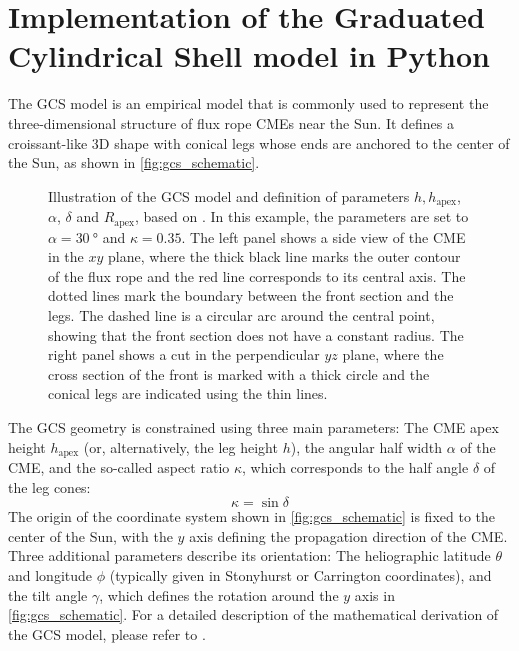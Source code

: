 \chapter{Implementation of the Graduated Cylindrical Shell model in Python}
\label{chp:GCS_Python}

The \acl{GCS} model \citep[\acs{GCS},][]{Thernisien-2006-GCS,Thernisien-2011-GCS} is an empirical model that is commonly used to represent the three-dimensional structure of flux rope \acp{CME}  near the Sun. It defines a croissant-like 3D shape with conical legs whose ends are anchored to the center of the Sun, as shown in \autoref{fig:gcs_schematic}.

\begin{figure}
    
    \caption[Illustration of the \acs{GCS} model]{Illustration of the \ac{GCS} model and definition of parameters $h, h_\text{apex}$, $\alpha$, $\delta$ and $R_\text{apex}$, based on \citet{Thernisien-2011-GCS}. In this example, the parameters are set to $\alpha = \SI{30}{\degree}$ and $\kappa = 0.35$. The left panel shows a side view of the \ac{CME} in the $xy$ plane, where the thick black line marks the outer contour of the flux rope and the red line corresponds to its central axis. The dotted lines mark the boundary between the front section and the legs. The dashed line is a circular arc around the central point, showing that the front section does not have a constant radius. The right panel shows a cut in the perpendicular $yz$ plane, where the cross section of the front is marked with a thick circle and the conical legs are indicated using the thin lines.}
    \label{fig:gcs_schematic}
\end{figure}

The \ac{GCS} geometry is constrained using three main parameters: The \ac{CME} apex height $h_\text{apex}$ (or, alternatively, the leg height $h$), the angular half width $\alpha$ of the \ac{CME}, and the so-called aspect ratio $\kappa$, which corresponds to the half angle $\delta$ of the leg cones:
\begin{equation}
    \kappa = \sin \delta
\end{equation}
The origin of the coordinate system shown in \autoref{fig:gcs_schematic} is fixed to the center of the Sun, with the $y$ axis defining the propagation direction of the CME. Three additional parameters describe its orientation: The heliographic latitude $\theta$ and longitude $\phi$ (typically given in Stonyhurst or Carrington coordinates), and the tilt angle $\gamma$, which defines the rotation around the $y$ axis in \autoref{fig:gcs_schematic}. For a detailed description of the mathematical derivation of the \ac{GCS} model, please refer to \citet{Thernisien-2011-GCS}.

